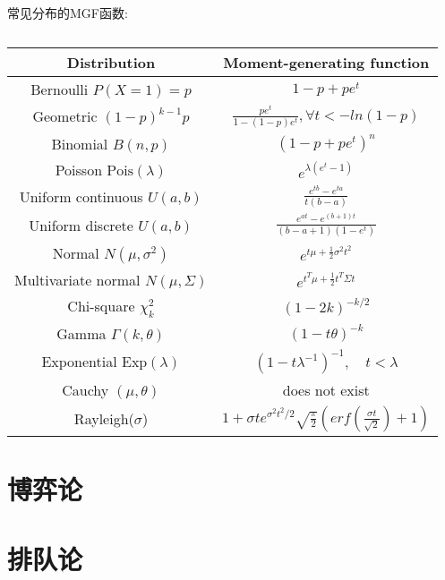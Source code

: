 \documentclass[fontset=none,oneside]{book}
\begin{document}
常见分布的MGF函数:
\begin{table}[htbp]
\centering
\begin{tabular}{|c|c|}
\hline Distribution & Moment-generating function \\
\hline Bernoulli $P(X=1)=p$ & $1-p+pe^{t}$ \\
\hline Geometric $(1-p)^{k-1}p$ & $\frac{pe^{t}}{1-(1-p)e^{t}},\forall
                                  t < -ln(1-p)$ \\
\hline Binomial $B(n,p)$ & $(1-p+pe^{t})^{n}$ \\
\hline Poisson $\mathrm{Pois}(\lambda)$ & $e^{\lambda(e^{t}-1)}$ \\
\hline Uniform continuous $U(a,b)$ & $\frac{e^{tb}-e^{ta}}{t(b-a)}$ \\
\hline Uniform discrete $U(a,b)$ &
                                   $\frac{e^{at}-e^{(b+1)t}}{(b-a+1)(1-e^{t})}$
  \\
\hline Normal $N(\mu,\sigma^{2})$ &
                                    $e^{t\mu+\frac{1}{2}\sigma^{2}t^{2}}$
  \\
\hline Multivariate normal $N(\mu,\Sigma)$ &
                                             $e^{t^{T}\mu+\frac{1}{2}t^{T}\Sigma
                                             t}$ \\
\hline Chi-square $\chi_{k}^{2}$ & $(1-2k)^{-k/2}$ \\
\hline Gamma $\Gamma(k,\theta)$ & $(1-t\theta)^{-k}$ \\
\hline Exponential $\mathrm{Exp}(\lambda)$ & $(1-t\lambda^{-1})^{-1},\quad
                                    t<\lambda$ \\
\hline Cauchy $(\mu,\theta)$ & does not exist \\
\hline Rayleigh($\sigma$) & $1+\sigma
                            te^{\sigma^{2}t^{2}/2}\sqrt{\frac{\pi}{2}}(erf(\frac{\sigma
                            t}{\sqrt{2}})+1)$ \\
\hline
\end{tabular}
\caption{\label{tab:mgf}}
\end{table}
\chapter{博弈论}
\chapter{排队论}

 
\end{document}
